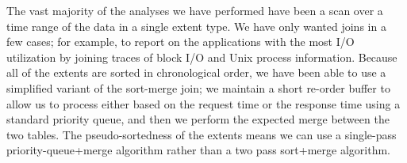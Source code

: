 The vast majority of the analyses we have performed
have been a scan
over a time range of the data in a single extent type.  We have only
wanted joins in a few cases; for example,
to report on the applications with
the most I/O utilization by joining traces of block I/O and Unix process
information.
Because all of the extents are sorted in chronological order, we have been able
to use a simplified variant of the sort-merge join; we maintain a
short re-order buffer to allow us to process either based on the
request time or the response time using a standard priority queue, and
then we perform the expected merge between the two tables.  The
pseudo-sortedness of the extents means we can use a single-pass
priority-queue+merge algorithm rather than a two pass
\linebreak[4] sort+merge algorithm.

